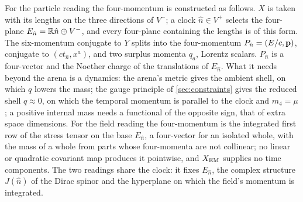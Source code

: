 For the particle reading the four-momentum is constructed as follows. $X$ is taken with its lengths on the three directions of $V^-$; a clock $\hat n\in V^+$
selects the four-plane $E_{\hat n}=\mathbb{R} \hat n\oplus V^-$, and every four-plane containing the lengths is of this form. The six-momentum conjugate to $Y$ splits into the
four-momentum $P_{\hat n}=(E/c,\mathbf p)$, conjugate to $(ct_{\hat n},x^a)$, and two surplus momenta $q_a$, Lorentz scalars. $P_{\hat n}$ is a four-vector and the Noether charge of
the translations of $E_{\hat n}$. What it needs beyond the arena is a dynamics: the arena's metric gives the ambient shell, on which $q$ lowers the mass;
the gauge principle of \cref{sec:constraints} gives the reduced shell $q\approx0$, on which the temporal momentum is parallel to the clock and $m_4=\mu$; a positive internal mass
needs a functional of the opposite sign, that of extra space dimensions. For the field reading the four-momentum is the integrated first row of the stress
tensor on the base $E_{\hat n}$, a four-vector for an isolated whole, with the mass of a whole from parts whose four-momenta are not collinear; no linear or quadratic covariant map
produces it pointwise, and $X_{\rm EM}$ supplies no time components. The two readings share the clock: it fixes $E_{\hat n}$, the complex structure $J(\hat n)$ of the
Dirac spinor and the hyperplane on which the field's momentum is integrated.

